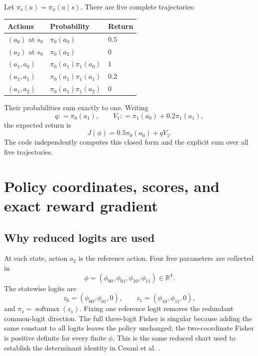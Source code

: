 \documentclass[10pt,a4paper]{article}
\newcommand{\R}{\mathbb{R}}
\newcommand{\coloneqq}{\mathrel{\mathop:}=}
\begin{document}
Let $\pi_s(a)=\pi_\phi(a\mid s)$.  There are five complete trajectories:
\begin{center}\small
\begin{tabular}{lll}
\toprule
Actions & Probability & Return\\ \midrule
$(a_0)$ at $s_0$ & $\pi_0(a_0)$ & $0.5$\\
$(a_2)$ at $s_0$ & $\pi_0(a_2)$ & $0$\\
$(a_1,a_0)$ & $\pi_0(a_1)\pi_1(a_0)$ & $1$\\
$(a_1,a_1)$ & $\pi_0(a_1)\pi_1(a_1)$ & $0.2$\\
$(a_1,a_2)$ & $\pi_0(a_1)\pi_1(a_2)$ & $0$\\ \bottomrule
\end{tabular}
\end{center}
Their probabilities sum exactly to one.  Writing
\begin{equation}
q\coloneqq\pi_0(a_1),
\qquad
V_1\coloneqq\pi_1(a_0)+0.2\pi_1(a_1),
\end{equation}
the expected return is
\begin{equation}
\boxed{J(\phi)=0.5\pi_0(a_0)+qV_1.}
\label{eq:return}
\end{equation}
The code independently computes this closed form and the explicit sum over all
five trajectories.

\section{Policy coordinates, scores, and exact reward gradient}

\subsection{Why reduced logits are used}

At each state, action $a_2$ is the reference action.  Four free parameters are
collected in
\begin{equation}
\phi=(\phi_{00},\phi_{01},\phi_{10},\phi_{11})\in\R^4.
\end{equation}
The statewise logits are
\begin{equation}
z_0=(\phi_{00},\phi_{01},0),
\qquad
z_1=(\phi_{10},\phi_{11},0),
\end{equation}
and $\pi_s=\operatorname{softmax}(z_s)$.  Fixing one reference logit removes the
redundant common-logit direction.  The full three-logit Fisher is singular
because adding the same constant to all logits leaves the policy unchanged;
the two-coordinate Fisher is positive definite for every finite $\phi$.
This is the same reduced chart used to establish the determinant identity in
Cesani et al. \cite[Sec.~4]{cesani2026}.
\end{document}
